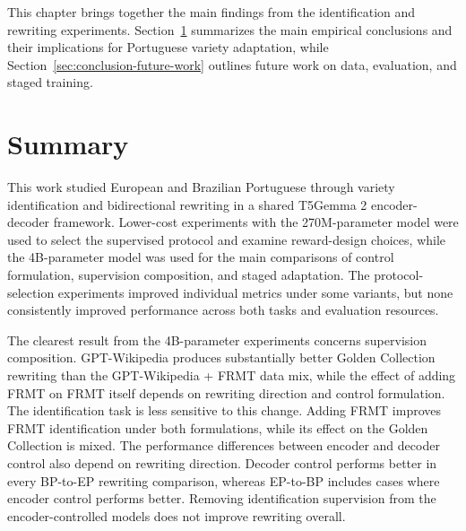 \label{chap:conclusion}

This chapter brings together the main findings from the identification and
rewriting experiments. Section~\ref{sec:conclusion-summary} summarizes the main
empirical conclusions and their implications for Portuguese variety adaptation,
while Section~\ref{sec:conclusion-future-work} outlines future work on data,
evaluation, and staged training.

\section{Summary}
\label{sec:conclusion-summary}

{
This work studied European and Brazilian Portuguese through variety
identification and bidirectional rewriting in a shared T5Gemma 2 encoder-decoder
framework. Lower-cost experiments with the 270M-parameter model were used to
select the supervised protocol and examine reward-design choices, while the
4B-parameter model was used for the main comparisons of control formulation,
supervision composition, and staged adaptation. The protocol-selection
experiments improved individual metrics under some variants, but none
consistently improved performance across both tasks and evaluation resources.\par}

{
The clearest result from the 4B-parameter experiments concerns supervision
composition. GPT-Wikipedia produces substantially better Golden Collection
rewriting than the GPT-Wikipedia + FRMT data mix, while the effect of adding FRMT
on FRMT itself depends on rewriting direction and control formulation. The
identification task is less sensitive to this change. Adding FRMT improves FRMT
identification under both formulations, while its effect on the Golden
Collection is mixed. The performance differences between encoder and decoder
control also depend on rewriting direction. Decoder control performs better in
every BP-to-EP rewriting comparison, whereas EP-to-BP includes cases where
encoder control performs better. Removing identification supervision from the
encoder-controlled models does not improve rewriting overall.\par}

